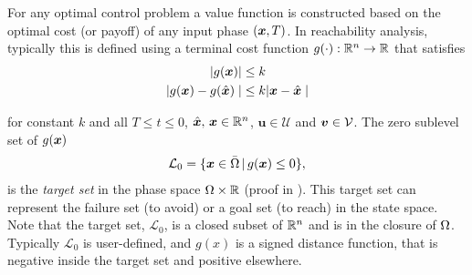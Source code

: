 For any optimal control problem a value function is constructed based on the optimal cost (or payoff) of any input phase $(\bm{x}, T)$.  In reachability analysis, typically this is defined using a terminal cost function $g(\cdot): \mathbb{R}^n \rightarrow \mathbb{R}$ that satisfies 
\begin{subequations}
	\begin{align}
		| g(\bm{x}) | &\le k \\
		| g(\bm{x}) - g(\hat{\bm{x}}) \mid &\le k | \bm{x} - \hat{\bm{x}} \mid
	\end{align}
\end{subequations}

%
%
for constant $k$ and all 
$T \le t \le 0$, $\hat{\bm{x}}, \, \bm{x} \in \mathbb{R}^n$, $\bm{u}\in \mathcal{U}$ and $\bm{v} \in \mathcal{V}$.  The zero sublevel set of $g(\bm{x})$ \ie
%
\begin{align}
	\mathcal{L}_0 = \{ \state \in \bar{\Omega} \,|\, g(\state) \le 0 \},
	\label{eq:target_set}
\end{align}
%
is the \textit{target set} in the phase space $\Omega \times \mathbb{R}$ (proof in \cite{Mitchell2005}). This target set can represent the failure set (to avoid) or a goal set (to reach) in the state space. Note that the target set, $\mathcal{L}_0$, is a closed subset of $\mathbb{R}^n$ and is in the closure of $\Omega$. Typically $\mathcal{L}_0$ is user-defined, and $g(x)$ is a signed distance function, that is negative inside the target set and positive elsewhere.

